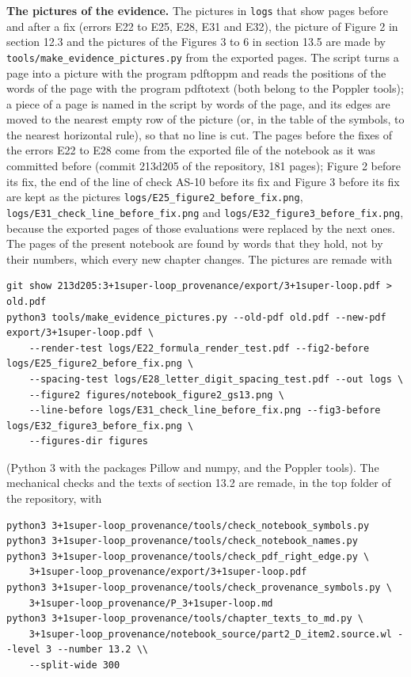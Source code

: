 \documentclass[
  10pt,
]{article}
\begin{document}
\textbf{The pictures of the evidence.} The pictures in \texttt{logs}
that show pages before and after a fix (errors E22 to E25, E28, E31 and
E32), the picture of Figure 2 in section 12.3 and the pictures of the
Figures 3 to 6 in section 13.5 are made by
\texttt{tools/make\_evidence\_pictures.py} from the exported pages. The
script turns a page into a picture with the program pdftoppm and reads
the positions of the words of the page with the program pdftotext (both
belong to the Poppler tools); a piece of a page is named in the script
by words of the page, and its edges are moved to the nearest empty row
of the picture (or, in the table of the symbols, to the nearest
horizontal rule), so that no line is cut. The pages before the fixes of
the errors E22 to E28 come from the exported file of the notebook as it
was committed before (commit 213d205 of the repository, 181 pages);
Figure 2 before its fix, the end of the line of check AS-10 before its
fix and Figure 3 before its fix are kept as the pictures
\texttt{logs/E25\_figure2\_before\_fix.png},
\texttt{logs/E31\_check\_line\_before\_fix.png} and
\texttt{logs/E32\_figure3\_before\_fix.png}, because the exported pages
of those evaluations were replaced by the next ones. The pages of the
present notebook are found by words that they hold, not by their
numbers, which every new chapter changes. The pictures are remade with

\begin{verbatim}
git show 213d205:3+1super-loop_provenance/export/3+1super-loop.pdf > old.pdf
python3 tools/make_evidence_pictures.py --old-pdf old.pdf --new-pdf export/3+1super-loop.pdf \
    --render-test logs/E22_formula_render_test.pdf --fig2-before logs/E25_figure2_before_fix.png \
    --spacing-test logs/E28_letter_digit_spacing_test.pdf --out logs \
    --figure2 figures/notebook_figure2_gs13.png \
    --line-before logs/E31_check_line_before_fix.png --fig3-before logs/E32_figure3_before_fix.png \
    --figures-dir figures
\end{verbatim}

(Python 3 with the packages Pillow and numpy, and the Poppler tools).
The mechanical checks and the texts of section 13.2 are remade, in the
top folder of the repository, with

\begin{verbatim}
python3 3+1super-loop_provenance/tools/check_notebook_symbols.py
python3 3+1super-loop_provenance/tools/check_notebook_names.py
python3 3+1super-loop_provenance/tools/check_pdf_right_edge.py \
    3+1super-loop_provenance/export/3+1super-loop.pdf
python3 3+1super-loop_provenance/tools/check_provenance_symbols.py \
    3+1super-loop_provenance/P_3+1super-loop.md
python3 3+1super-loop_provenance/tools/chapter_texts_to_md.py \
    3+1super-loop_provenance/notebook_source/part2_D_item2.source.wl --level 3 --number 13.2 \\
    --split-wide 300
\end{verbatim}
\end{document}
